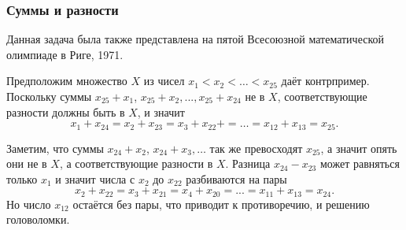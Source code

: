 \subsubsection*{Суммы и разности}%

Данная задача была также представлена на пятой Всесоюзной математической олимпиаде в Риге, 1971.

\medskip



Предположим множество $X$ из чисел $x_1 < x_2 < \dots < x_{25}$ даёт контрпример.
Поскольку суммы $x_{25} + x_1$, $x_{25} + x_2, ..., x_{25} + x_{24}$ не в $X$,
соответствующие разности должны быть в $X$,
и значит
\[x_1 + x_{24} = x_2 + x_{23} = x_3 + x_{22} + =\dots = x_{12} + x_{13} = x_{25}.\]

Заметим, что суммы $x_{24} + x_2$, $x_{24} + x_3,\dots$ так же превосходят $x_{25}$,
а значит опять они не в $X$, а соответствующие разности в $X$.
Разница $x_{24} - x_{23}$ может равняться только $x_1$ и значит числа с $x_2$ до $x_{22}$ разбиваются на пары 
\[x_2 + x_{22} = x_3 + x_{21} = x_4 + x_{20} = ... = x_{11} + x_{13} = x_{24}.\]
Но число $x_{12}$ остаётся без пары, что приводит к противоречию, и решению головоломки.\heart

